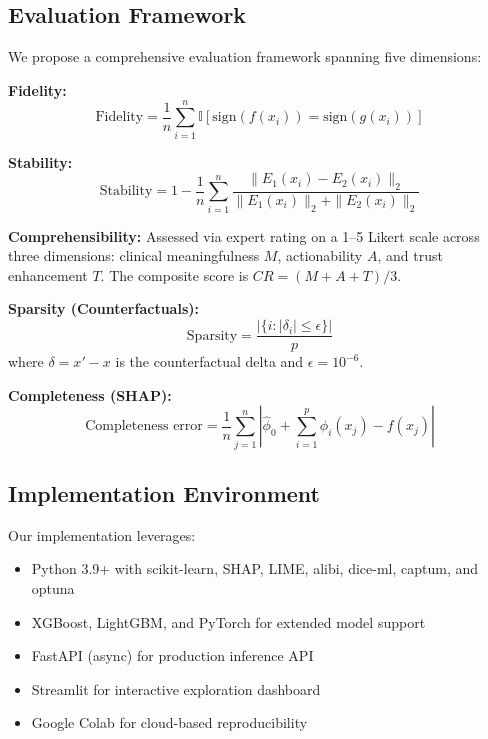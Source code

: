 \documentclass[journal]{IEEEtran}
\begin{document}
\subsection{Evaluation Framework}

We propose a comprehensive evaluation framework spanning five dimensions:

\textbf{Fidelity:}
\begin{equation}
\text{Fidelity} = \frac{1}{n} \sum_{i=1}^{n} \mathbb{I}[\text{sign}(f(x_i)) = \text{sign}(g(x_i))]
\end{equation}

\textbf{Stability:}
\begin{equation}
\text{Stability} = 1 - \frac{1}{n} \sum_{i=1}^{n} \frac{\|E_1(x_i) - E_2(x_i)\|_2}{\|E_1(x_i)\|_2 + \|E_2(x_i)\|_2}
\end{equation}

\textbf{Comprehensibility:} Assessed via expert rating on a 1--5 Likert scale across three dimensions: clinical meaningfulness $M$, actionability $A$, and trust enhancement $T$. The composite score is $CR = (M + A + T)/3$.

\textbf{Sparsity (Counterfactuals):}
\begin{equation}
\text{Sparsity} = \frac{|\{i : |\delta_i| \leq \epsilon\}|}{p}
\end{equation}
where $\delta = x' - x$ is the counterfactual delta and $\epsilon = 10^{-6}$.

\textbf{Completeness (SHAP):}
\begin{equation}
\text{Completeness error} = \frac{1}{n}\sum_{j=1}^{n}\left|\hat{\phi}_0 + \sum_{i=1}^{p}\phi_i(x_j) - f(x_j)\right|
\end{equation}

\subsection{Implementation Environment}

Our implementation leverages:
\begin{itemize}
\item Python 3.9+ with scikit-learn, SHAP, LIME, alibi, dice-ml, captum, and optuna
\item XGBoost, LightGBM, and PyTorch for extended model support
\item FastAPI (async) for production inference API
\item Streamlit for interactive exploration dashboard
\item Google Colab for cloud-based reproducibility
\end{itemize}
\end{document}
